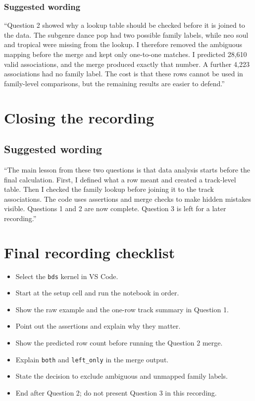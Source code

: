 \documentclass[11pt,a4paper]{article}
\begin{document}
\subsubsection*{Suggested wording}
``Question 2 showed why a lookup table should be checked before it is joined to the data. The subgenre dance pop had two possible family labels, while neo soul and tropical were missing from the lookup. I therefore removed the ambiguous mapping before the merge and kept only one-to-one matches. I predicted 28,610 valid associations, and the merge produced exactly that number. A further 4,223 associations had no family label. The cost is that these rows cannot be used in family-level comparisons, but the remaining results are easier to defend.''

\section{Closing the recording}

\subsection*{Suggested wording}
``The main lesson from these two questions is that data analysis starts before the final calculation. First, I defined what a row meant and created a track-level table. Then I checked the family lookup before joining it to the track associations. The code uses assertions and merge checks to make hidden mistakes visible. Questions 1 and 2 are now complete. Question 3 is left for a later recording.''

\section*{Final recording checklist}
\begin{itemize}[leftmargin=1.5em]
    \item Select the \texttt{bds} kernel in VS Code.
    \item Start at the setup cell and run the notebook in order.
    \item Show the raw example and the one-row track summary in Question 1.
    \item Point out the assertions and explain why they matter.
    \item Show the predicted row count before running the Question 2 merge.
    \item Explain \texttt{both} and \texttt{left\_only} in the merge output.
    \item State the decision to exclude ambiguous and unmapped family labels.
    \item End after Question 2; do not present Question 3 in this recording.
\end{itemize}
\end{document}

